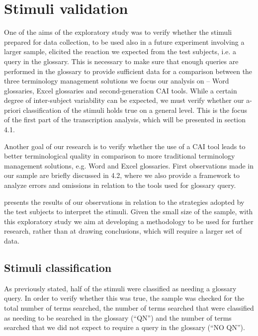 \documentclass[output=paper]{langsci/langscibook}
\begin{document}
\section{Stimuli validation}\label{sec:prandi:5}
One of the aims of the exploratory study was to verify whether the stimuli prepared for data collection, to be used also in a future experiment involving a larger sample, elicited the reaction we expected from the test subjects, i.e. a query in the glossary. This is necessary to make sure that enough queries are performed in the glossary to provide sufficient data for a comparison between the three terminology management solutions we focus our analysis on – Word glossaries, Excel glossaries and second-generation \textsc{CAI} tools. While a certain degree of inter-subject variability can be expected, we must verify whether our a-priori classification of the stimuli holds true on a general level. This is the focus of the first part of the transcription analysis, which will be presented in section 4.1.

Another goal of our research is to verify whether the use of a \textsc{CAI} tool leads to better terminological quality in comparison to more traditional terminology management solutions, e.g. Word and Excel glossaries. First observations made in our sample are briefly discussed in 4.2, where we also provide a framework to analyze errors and omissions in relation to the tools used for glossary query.

 presents the results of our observations in relation to the strategies adopted by the test subjects to interpret the stimuli. Given the small size of the sample, with this exploratory study we aim at developing a methodology to be used for further research, rather than at drawing conclusions, which will require a larger set of data. 

\subsection{Stimuli classification}\label{sec:prandi:5.1}
As previously stated, half of the stimuli were classified as needing a glossary query. In order to verify whether this was true, the sample was checked for the total number of terms searched, the number of terms searched that were classified as needing to be searched in the glossary (``QN'') and the number of terms searched that we did not expect to require a query in the glossary (``NO QN''). 
\end{document}
